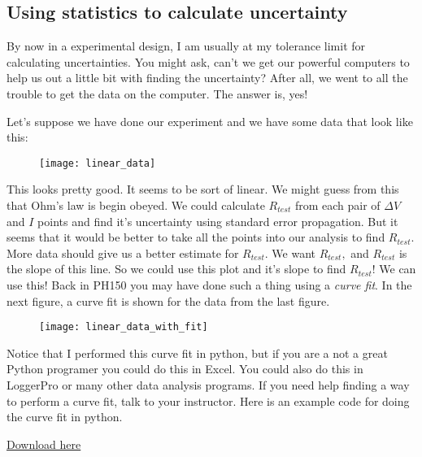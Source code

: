 \subsection{Using statistics to calculate uncertainty}

By now in a experimental design, I am usually at my tolerance limit for calculating uncertainties. You might ask, can't we get our powerful computers to help us out a little bit with finding the uncertainty? After all, we went to all the trouble to get the data on the computer. The answer is, yes!

Let's suppose we have done our experiment and we have some data that look like this: 

\begin{figure}[h!]
	\centering
	\texttt{[image: linear\_data]}
\end{figure}

This looks pretty good. It seems to be sort of linear. We might guess from this that Ohm's law is begin obeyed.  We could calculate $R_{test}$ from each pair of $\Delta V$ and $I$ points and find it's uncertainty using standard error propagation. But it seems that it would be better to take all the points into our analysis to find $R_{test}.$ More data should give us a better estimate for $R_{test}.$  We want $R_{test},$ and $R_{test}$ is the slope of this line. So we could use this plot and it's slope to find $R_{test}$! We can use this! Back in PH150 you may have done such a thing using a \emph{curve fit}. In the next figure, a curve fit is shown for the data from the last figure. 

\begin{figure}[h!]
	\centering
	\texttt{[image: linear\_data\_with\_fit]}
\end{figure}

Notice that I performed this curve fit in python, but if you are a not a great Python programer you could do this in Excel. You could also do this in LoggerPro or many other data analysis programs. If you need help finding a way to perform a curve fit, talk to your instructor. Here is an example code for doing the curve fit in python.

\vspace{0.24in}
\href{https://raw.githubusercontent.com/rtlines/IntermediateLabPH250/main/Code/linear_fit.py}{Download here}



